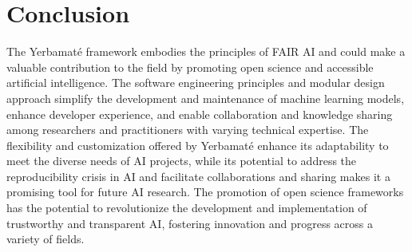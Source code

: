 \section{Conclusion}


The Yerbamaté framework embodies the principles of FAIR AI and could make a valuable contribution to the field by promoting open science and accessible artificial intelligence. The software engineering principles and modular design approach simplify the development and maintenance of machine learning models, enhance developer experience, and enable collaboration and knowledge sharing among researchers and practitioners with varying technical expertise. The flexibility and customization offered by Yerbamaté enhance its adaptability to meet the diverse needs of AI projects, while its potential to address the reproducibility crisis in AI and facilitate collaborations and sharing makes it a promising tool for future AI research. The promotion of open science frameworks has the potential to revolutionize the development and implementation of trustworthy and transparent AI, fostering innovation and progress across a variety of fields.


